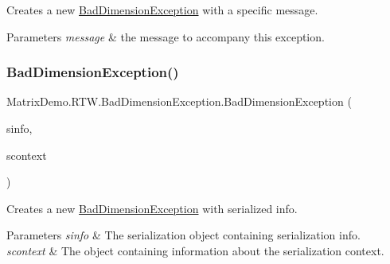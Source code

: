 Creates a new \mbox{\hyperlink{class_matrix_demo_1_1_r_t_w_1_1_bad_dimension_exception}{Bad\+Dimension\+Exception}} with a specific message. 


\begin{DoxyParams}{Parameters}
{\em message} & the message to accompany this exception.\\
\hline
\end{DoxyParams}
\mbox{\label{class_matrix_demo_1_1_r_t_w_1_1_bad_dimension_exception_ac8b77428bbfa83daf5d72873c5ea2cfa}} 
\subsubsection{\texorpdfstring{Bad\+Dimension\+Exception()}{BadDimensionException()}\hspace{0.1cm}{\footnotesize\ttfamily [3/4]}}
{\footnotesize\ttfamily Matrix\+Demo.\+R\+T\+W.\+Bad\+Dimension\+Exception.\+Bad\+Dimension\+Exception (\begin{DoxyParamCaption}\item[{Serialization\+Info}]{sinfo,  }\item[{Streaming\+Context}]{scontext }\end{DoxyParamCaption})}



Creates a new \mbox{\hyperlink{class_matrix_demo_1_1_r_t_w_1_1_bad_dimension_exception}{Bad\+Dimension\+Exception}} with serialized info. 


\begin{DoxyParams}{Parameters}
{\em sinfo} & The serialization object containing serialization info.\\
\hline
{\em scontext} & The object containing information about the serialization context.\\
\hline
\end{DoxyParams}
\mbox{\label{class_matrix_demo_1_1_r_t_w_1_1_bad_dimension_exception_a7cbc7dfbc98f0834b5954db4e41a5c10}} 
